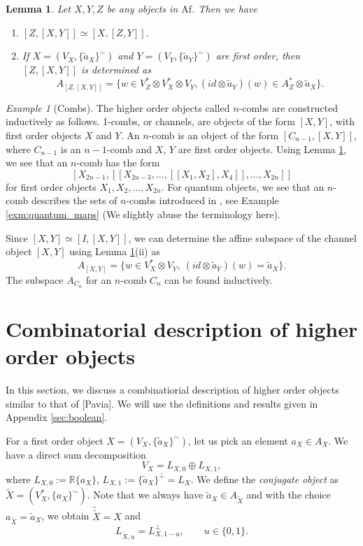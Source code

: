\documentclass[12pt]{article}
\newtheorem{lemma}{Lemma}
\theoremstyle{definition}
\theoremstyle{remark}
\newtheorem{exm}{Example}
\def \Af{\mathrm{Af}}
\begin{document}
\begin{lemma}\label{lemma:combs} Let $X,Y,Z$ be any objects in $\Af$. Then we have
\begin{enumerate}
\item[(i)] $[Z,[X,Y]]\simeq [X,[Z,Y]]$.
\item[(ii)] If $X=(V_X,\{\tilde a_X\}^\sim)$ and $Y=(V_Y, \{\tilde a_Y\}^\sim)$ are first order, 
then $[Z,[X,Y]]$ is determined as
\[
A_{[Z,[X,Y]]}=\{w\in V_{Z}^*\otimes V_X^*\otimes V_Y, (id\otimes \tilde a_Y)(w)\in
A_Z^*\otimes \tilde a_X\}.
\]

\end{enumerate}


\end{lemma}



\begin{exm}[Combs] The higher order objects called $n$-combs are constructed inductively as follows. 
1-combs, or channels, are objects of the form $[X,Y]$, with  first order objects $X$ and $Y$. An
$n$-comb is an object of the form $[C_{n-1},[X,Y]]$, where $C_{n-1}$ is an $n-1$-comb and
$X$, $Y$ are first order objects. Using Lemma \ref{lemma:combs}, we see that an $n$-comb
has the form
\[
[X_{2n-1},[[X_{2n-3},\dots,[[X_1,X_2],X_4]],\dots,X_{2n}]]
\]
for first order objects $X_1,X_2,\dots,X_{2n}$. For quantum objects, we see that
an $n$-comb describes the sets of $n$-combs introduced in {}, see Example
\ref{exm:quantum_maps} (We slightly  abuse
the terminology here).

Since $[X,Y]\simeq [I,[X,Y]]$, we can determine the affine subspace of the channel object $[X,Y]$
using Lemma \ref{lemma:combs}(ii) as
\[
A_{[X,Y]}=\{w\in V_X^*\otimes V_Y,\ (id\otimes \tilde a_Y)(w)=\tilde a_X\}.
\]
The subspace $A_{C_n}$ for an $n$-comb $C_n$ can be found inductively. 

\end{exm}




\section{Combinatorial description of higher order objects}

In this section, we discuss a combinatiorial description of higher order objects similar
to that of [Pavia]. We will use the definitions and results given in Appendix
\ref{sec:boolean}.

For a first order object $X=(V_X, \{\tilde a_X\}^\sim)$, let us pick an element $a_X\in
A_X$. We have a direct sum decomposition
\[
V_X=L_{X,0}\oplus L_{X,1},
\]
where $L_{X,0}:= \mathbb R\{a_X\}$, $L_{X,1}:=\{\tilde a_X\}^\perp=L_X$.
We define the {\em conjugate object}  as $\tilde X=(V_X^*,\{a_X\}^\sim)$. Note that we always
have $\tilde a_X\in A_{\tilde X}$ and with the choice $a_{\tilde X}=\tilde a_X$, we obtain 
$\tilde{\tilde X}=X$ and 
\begin{equation}\label{eq:complement}
L_{\tilde X,u}=L_{X,1-u}^\perp,\qquad u\in \{0,1\}.
\end{equation}
\end{document}
